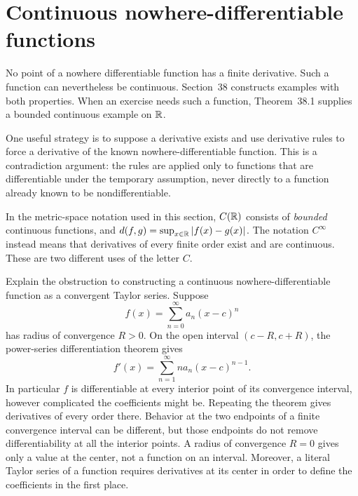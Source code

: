 \section{Continuous nowhere-differentiable functions}
\label{sec:nowhere-differentiable}
No point of a nowhere differentiable function has a finite derivative.
Such a function can nevertheless be continuous. Section~38
constructs examples with both properties.
When an exercise needs such a function, Theorem~38.1 supplies
a bounded continuous example on $\mathbb{R}$.

One useful strategy is to suppose a derivative exists and use
derivative rules to force a derivative of the known nowhere-differentiable
function. This is a contradiction argument: the rules are applied
only to functions that are differentiable under the temporary
assumption, never directly to a function already known to be
nondifferentiable.

In the metric-space notation used in this section, $C(\mathbb{R})$ consists
of \emph{bounded} continuous functions, and
$d(f,g)=\sup_{x\in\mathbb{R}}|f(x)-g(x)|$. The notation $C^\infty$
instead means that derivatives of every finite order exist and are
continuous. These are two different uses of the letter $C$.

\goal Explain the obstruction to constructing a continuous
nowhere-differentiable function as a convergent Taylor series.
Suppose
\[
 f(x)=\sum_{n=0}^\infty a_n(x-c)^n
\]
has radius of convergence $R>0$. On the open interval
$(c-R,c+R)$, the power-series differentiation theorem gives
\[
 f'(x)=\sum_{n=1}^\infty n a_n(x-c)^{n-1}.
\]
In particular $f$ is differentiable at every interior point of its
convergence interval, however complicated the coefficients might be.
Repeating the theorem gives derivatives of every order there.
Behavior at the two endpoints of a finite convergence interval
can be different, but those endpoints do not remove differentiability
at all the interior points. A radius of convergence $R=0$ gives
only a value at the center, not a function on an interval.
Moreover, a literal Taylor series of a function requires derivatives
at its center in order to define the coefficients in the first place.

